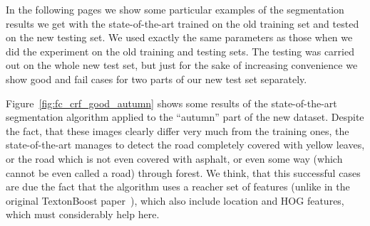 In the following pages we show some particular examples of the segmentation results we get with the state-of-the-art trained on the old training set
and tested on the new testing set. We used exactly the same parameters as those when we did the experiment on the old training and testing sets.
The testing was carried out on the whole new test set, but just for the sake of increasing convenience we show good and fail cases for two parts of
our new test set separately.

Figure~\ref{fig:fc_crf_good_autumn} shows some results of the state-of-the-art segmentation algorithm applied to the ``autumn'' part of the new dataset.
Despite the fact, that these images clearly differ very much from the training ones, the state-of-the-art manages to detect the road completely covered 
with yellow leaves, or the road which is not even covered with asphalt, or even some way (which cannot be even called a road) through forest. We think,
that this successful cases are due the fact that the algorithm uses a reacher set of features (unlike in the original TextonBoost paper~\cite{Shotton2009}),
which also include location and HOG features, which must considerably help here.

